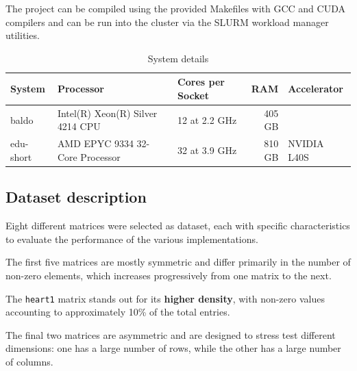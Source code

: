 \documentclass[conference]{IEEEtran}
\begin{document}
        The project can be compiled using the provided Makefiles with GCC and
        CUDA compilers and can be run into the cluster via the SLURM workload
        manager utilities.

        \begin{table}[ht]
            \caption{System details}
            \label{tab:system_description}
            \centering
            \begin{adjustbox}{width=\columnwidth}
            \begin{tabular}{lllrl}
            \toprule
            \textbf{System} &  \textbf{Processor} & \textbf{Cores per Socket} & \textbf{RAM} & \textbf{Accelerator} \\
            \midrule
                baldo & Intel(R) Xeon(R) Silver 4214 CPU & 12 at 2.2 GHz & 405 GB & \\
                edu-short & AMD EPYC 9334 32-Core Processor & 32 at 3.9 GHz & 810 GB & NVIDIA L40S \\
            \bottomrule
            \end{tabular}
            \end{adjustbox}
        \end{table}

        \subsection{Dataset description}
        
        Eight different matrices were selected as dataset, each with specific
        characteristics to evaluate the performance of the various
        implementations.

        The first five matrices are mostly symmetric and differ primarily in
        the number of non-zero elements, which increases progressively from one
        matrix to the next.

        The \texttt{heart1} matrix stands out for its \textbf{higher density},
        with non-zero values accounting to approximately 10\% of the total
        entries.

        The final two matrices are asymmetric and are designed to stress test
        different dimensions: one has a large number of rows, while the other
        has a large number of columns.
\end{document}
